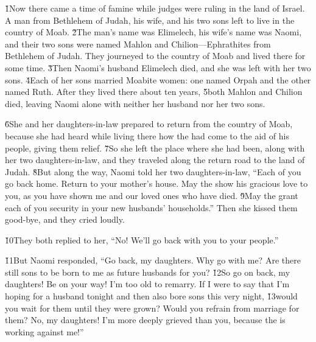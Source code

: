 


\v{1}Now there came a time of famine while judges were ruling in the land of Israel. A man from Bethlehem of Judah, his wife, and his two sons left to live in the country of Moab. \v{2}The man's name was Elimelech, his wife's name was Naomi, and their two sons were named Mahlon and Chilion---Ephrathites from Bethlehem of Judah. They journeyed to the country of Moab and lived there for some time. \v{3}Then Naomi's husband Elimelech died, and she was left with her two sons. \v{4}Each of her sons married Moabite women: one named Orpah and the other named Ruth. After they lived there about ten years, \v{5}both Mahlon and Chilion died, leaving Naomi alone with neither her husband nor her two sons.

\v{6}She and her daughters-in-law prepared to return from the country of Moab, because she had heard while living there how the  had come to the aid of his people, giving them relief. \v{7}So she left the place where she had been, along with her two daughters-in-law, and they traveled along the return road to the land of Judah. \v{8}But along the way, Naomi told her two daughters-in-law, ``Each of you go back home. Return to your mother's house. May the  show his gracious love to you, as you have shown me and our loved ones who have died. \v{9}May the  grant each of you security in your new husbands' households.'' Then she kissed them good-bye, and they cried loudly.

\v{10}They both replied to her, ``No! We'll go back with you to your people.''

\v{11}But Naomi responded, ``Go back, my daughters. Why go with me? Are there still sons to be born to me as future husbands for you? \v{12}So go on back, my daughters! Be on your way! I'm too old to remarry. If I were to say that I'm hoping for a husband tonight and then also bore sons this very night, \v{13}would you wait for them until they were grown? Would you refrain from marriage for them? No, my daughters! I'm more deeply grieved than you, because the  is working against me!''

